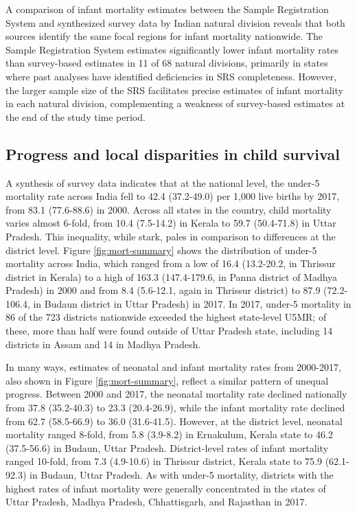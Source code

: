 \documentclass[
]{article}
\begin{document}
A comparison of infant mortality estimates between the Sample Registration System and synthesized survey data by Indian natural division reveals that both sources identify the same focal regions for infant mortality nationwide. The Sample Registration System estimates significantly lower infant mortality rates than survey-based estimates in 11 of 68 natural divisions, primarily in states where past analyses have identified deficiencies in SRS completeness. However, the larger sample size of the SRS facilitates precise estimates of infant mortality in each natural division, complementing a weakness of survey-based estimates at the end of the study time period.

\hypertarget{progress-and-local-disparities-in-child-survival}{%
\subsection{Progress and local disparities in child survival}\label{progress-and-local-disparities-in-child-survival}}

A synthesis of survey data indicates that at the national level, the under-5 mortality rate across India fell to 42.4 (37.2-49.0) per 1,000 live births by 2017, from 83.1 (77.6-88.6) in 2000. Across all states in the country, child mortality varies almost 6-fold, from 10.4 (7.5-14.2) in Kerala to 59.7 (50.4-71.8) in Uttar Pradesh. This inequality, while stark, pales in comparison to differences at the district level. Figure \ref{fig:mort-summary} shows the distribution of under-5 mortality across India, which ranged from a low of 16.4 (13.2-20.2, in Thrissur district in Kerala) to a high of 163.3 (147.4-179.6, in Panna district of Madhya Pradesh) in 2000 and from 8.4 (5.6-12.1, again in Thrissur district) to 87.9 (72.2-106.4, in Budaun district in Uttar Pradesh) in 2017. In 2017, under-5 mortality in 86 of the 723 districts nationwide exceeded the highest state-level U5MR; of these, more than half were found outside of Uttar Pradesh state, including 14 districts in Assam and 14 in Madhya Pradesh.

In many ways, estimates of neonatal and infant mortality rates from 2000-2017, also shown in Figure \ref{fig:mort-summary}, reflect a similar pattern of unequal progress. Between 2000 and 2017, the neonatal mortality rate declined nationally from 37.8 (35.2-40.3) to 23.3 (20.4-26.9), while the infant mortality rate declined from 62.7 (58.5-66.9) to 36.0 (31.6-41.5). However, at the district level, neonatal mortality ranged 8-fold, from 5.8 (3.9-8.2) in Ernakulum, Kerala state to 46.2 (37.5-56.6) in Budaun, Uttar Pradesh. District-level rates of infant mortality ranged 10-fold, from 7.3 (4.9-10.6) in Thrissur district, Kerala state to 75.9 (62.1-92.3) in Budaun, Uttar Pradesh. As with under-5 mortality, districts with the highest rates of infant mortality were generally concentrated in the states of Uttar Pradesh, Madhya Pradesh, Chhattisgarh, and Rajasthan in 2017.
\end{document}
